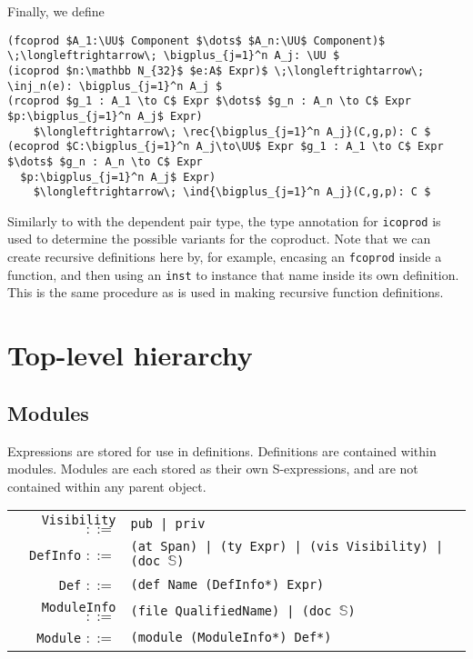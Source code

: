 \documentclass[11pt]{book}
\DeclareMathOperator*{\bigplus}{\scalerel*{+}{\textstyle\sum}}
\begin{document}
Finally, we define
\begin{lstlisting}[mathescape=true]
(fcoprod $A_1:\UU$ Component $\dots$ $A_n:\UU$ Component)$ \;\longleftrightarrow\; \bigplus_{j=1}^n A_j: \UU $
(icoprod $n:\mathbb N_{32}$ $e:A$ Expr)$ \;\longleftrightarrow\; \inj_n(e): \bigplus_{j=1}^n A_j $
(rcoprod $g_1 : A_1 \to C$ Expr $\dots$ $g_n : A_n \to C$ Expr $p:\bigplus_{j=1}^n A_j$ Expr)
    $\longleftrightarrow\; \rec{\bigplus_{j=1}^n A_j}(C,g,p): C $
(ecoprod $C:\bigplus_{j=1}^n A_j\to\UU$ Expr $g_1 : A_1 \to C$ Expr $\dots$ $g_n : A_n \to C$ Expr
  $p:\bigplus_{j=1}^n A_j$ Expr)
    $\longleftrightarrow\; \ind{\bigplus_{j=1}^n A_j}(C,g,p): C $
\end{lstlisting}
Similarly to with the dependent pair type, the type annotation for \lstinline{icoprod} is used to determine the possible variants for the coproduct.
Note that we can create recursive definitions here by, for example, encasing an \lstinline{fcoprod} inside a function, and then using an \lstinline{inst} to instance that name inside its own definition.
This is the same procedure as is used in making recursive function definitions.


\section{Top-level hierarchy}

\subsection{Modules}

Expressions are stored for use in definitions.
Definitions are contained within modules.
Modules are each stored as their own S-expressions, and are not contained within any parent object.

\begin{tabular}{r l p{7cm}}
    \lstinline!Visibility! \( ::= \) & \lstinline!pub | priv! \\
    \lstinline!DefInfo! \( ::= \) & \lstinline!(at Span) | (ty Expr) | (vis Visibility) | (doc !\( \mathbb S \)\lstinline!)! \\
    \lstinline!Def! \( ::= \) & \lstinline!(def Name (DefInfo*) Expr)! \\
    \lstinline!ModuleInfo! \( ::= \) & \lstinline!(file QualifiedName) | (doc !\( \mathbb S \)\lstinline!)! \\
    \lstinline!Module! \( ::= \) & \lstinline!(module (ModuleInfo*) Def*)!
\end{tabular}
\end{document}
